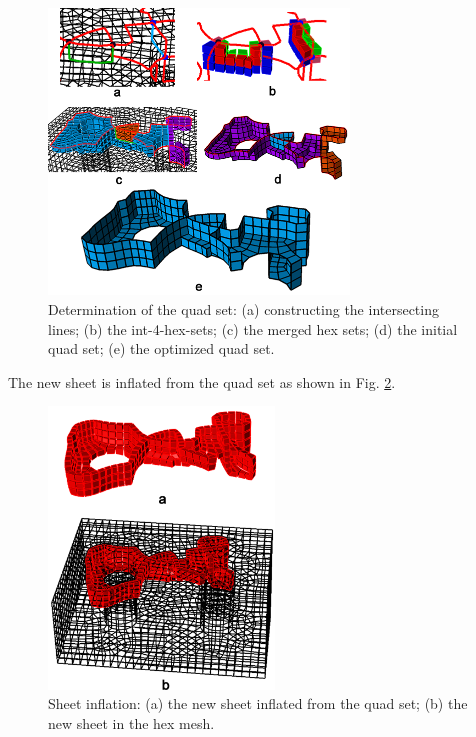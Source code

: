 \documentclass[final,5p,times,twocolumn]{elsarticle}
\begin{document}
\begin{figure}[htbp]
\begin{center}
\includegraphics[width=8cm]{exam1_quad_set.png}
\caption{Determination of the quad set: (a) constructing the intersecting lines; (b) the int-4-hex-sets; (c) the merged hex sets; (d) the initial quad set; (e) the optimized quad set.}
\label{fig:exam1_quad_set}
\end{center}
\end{figure}

The new sheet is inflated from the quad set as shown in Fig. \ref{fig:exam1_sheet}.

\begin{figure}[htbp]
\begin{center}
\includegraphics[width=6cm]{exam1_sheet.png}
\caption{Sheet inflation: (a) the new sheet inflated from the quad set; (b) the new sheet in the hex mesh.}
\label{fig:exam1_sheet}
\end{center}
\end{figure}

\end{document}
